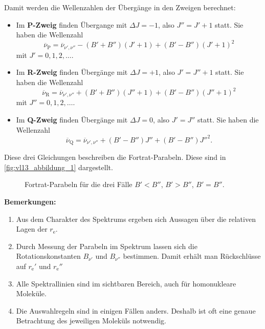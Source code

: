 	Damit werden die Wellenzahlen der Übergänge in den Zweigen berechnet:
	\begin{itemize}
		\item Im \textbf{P-Zweig} finden Übergange mit $\Delta J = -1$, also $J'' = J' +1$ statt. Sie haben die Wellenzahl
			$$
			\overline{\nu}_{\text{P}} = \overline{\nu}_{\nu', \nu''} - (B' + B'')(J'+1) + (B' - B'')(J'+ 1)^2 
			$$ 
			mit $J'= 0,1,2,\ldots$.
		\item Im \textbf{R-Zweig} finden Übergänge mit $\Delta J = + 1$, also $J' = J'' + 1$ statt. Sie haben die Wellenzahl
			$$
			\overline{\nu}_{\text{R}} = \overline{\nu}_{\nu', \nu''}+ (B' + B'') (J''+1) + (B' - B'') (J'' +1)^2
			$$
			mit $J'' = 0,1,2,\ldots$.
		\item Im \textbf{Q-Zweig} finden Übergänge mit $\Delta J = 0$, also $J' = J''$ statt. Sie haben die Wellenzahl
			$$
			\overline{\nu}_{\text{Q}} = \overline{\nu}_{\nu', \nu''} + (B' - B'') J'' + (B' - B'')J''^2.
			$$
	\end{itemize}
	Diese drei Gleichungen beschreiben die Fortrat-Parabeln. Diese sind in \autoref{fig:vl13_abbildung_1} dargestellt.

	\begin{figure}[H]
		\centering
		\caption{Fortrat-Parabeln für die drei Fälle $B'<B''$, $B'>B''$, $B'=B''$.}
		\label{fig:vl13_abbildung_1}
	\end{figure}

	\textbf{Bemerkungen:}
	\begin{enumerate}
		\item Aus dem Charakter des Spektrums ergeben sich Aussagen über die relativen Lagen der $r_{\mathrm{e}}$.
		\item Durch Messung der Parabeln im Spektrum lassen sich die Rotationskonstanten $B_{\nu'}$ und $B_{\nu''}$ bestimmen. Damit erhält man Rückschlüsse auf $r_{\mathrm{e}}'$ und $r_{\mathrm{e}}''$
		\item Alle Spektrallinien sind im sichtbaren Bereich, auch für homonukleare Moleküle.
		\item Die Auswahlregeln sind in einigen Fällen anders. Deshalb ist oft eine genaue Betrachtung des jeweiligen Moleküls notwendig.
	\end{enumerate}


